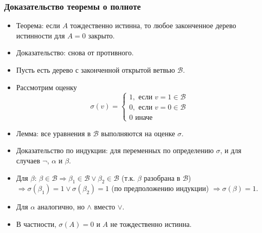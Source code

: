 \documentclass[10pt]{beamer}
\begin{document}
\begin{frame}
    \frametitle{Доказательство теоремы о полноте}
    \begin{itemize}
        \item Теорема: если $A$ тождественно истинна, то любое законченное дерево истинности для $A=0$ закрыто.
        \item Доказательство: снова от противного. 
        \pause
        \item Пусть есть дерево с законченной открытой ветвью $\mathcal{B}$.
        \pause
        \item Рассмотрим оценку 
        \[ \sigma(v) = \left\{ \begin{array}{l}
            1, \text{ если } v=1 \in \mathcal{B} \\
            0, \text{ если } v=0 \in \mathcal{B} \\
            0 \text{ иначе} 
        \end{array} \right. \]
        \item Лемма: все уравнения в $\mathcal{B}$ выполняются на оценке $\sigma$.
        \pause
        \item Доказательство по индукции: для переменных по определению $\sigma$, и для случаев $\neg$, $\alpha$ и $\beta$.
        \item Для $\beta$: $\beta \in \mathcal{B} \Rightarrow \beta_1 \in \mathcal{B} \lor \beta_2 \in \mathcal{B}$ (т.к. $\beta$ разобрана в $\mathcal{B}$) $\Rightarrow \sigma(\beta_1) = 1 \lor \sigma(\beta_2) = 1$ (по предположению индукции) $\Rightarrow \sigma(\beta) = 1$.
        \pause
        \item Для $\alpha$ аналогично, но $\land$ вместо $\lor$.
        \pause
        \item В частности, $\sigma(A)=0$ и $A$ не тождественно истинна.
    \end{itemize}
\end{frame}
\end{document}
